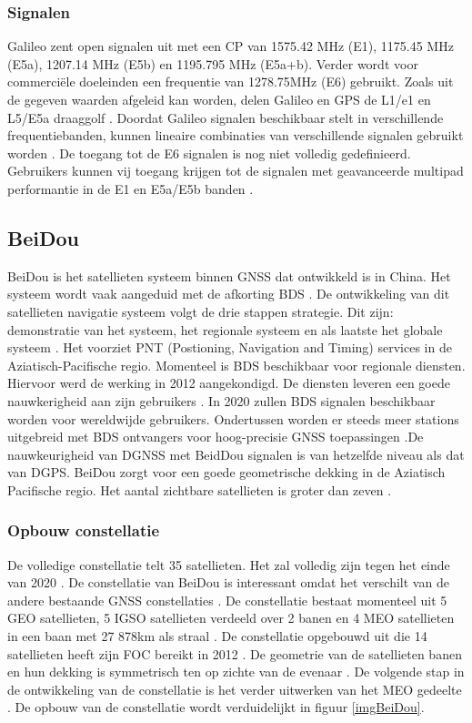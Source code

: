 \subsubsection{Signalen}
Galileo zent open signalen uit met een CP van 1575.42 MHz (E1), 1175.45 MHz (E5a), 1207.14 MHz (E5b) en 1195.795 MHz (E5a+b). Verder wordt voor commerci\"ele doeleinden een frequentie van 1278.75MHz (E6) gebruikt. Zoals uit de gegeven waarden afgeleid kan worden, delen Galileo en GPS de  L1/e1 en L5/E5a draaggolf \cite{LBibPPP2}. Doordat Galileo signalen beschikbaar stelt in verschillende frequentiebanden, kunnen lineaire combinaties van verschillende signalen gebruikt worden \cite{LBibGalileo3}. De toegang tot de E6 signalen is nog niet volledig gedefinieerd. Gebruikers kunnen vij toegang krijgen tot de signalen met geavanceerde multipad performantie in de E1 en E5a/E5b banden \cite{LBibGNSS9}. 

\subsection{BeiDou}
\label{LBeD}
BeiDou is het satellieten systeem binnen GNSS dat ontwikkeld is in China. Het systeem wordt vaak  aangeduid met de afkorting BDS \cite{LBibBeiDou}. De ontwikkeling van dit satellieten navigatie systeem volgt de drie stappen strategie. Dit zijn: demonstratie van het systeem, het regionale systeem en als laatste het globale systeem \cite{LBibBeiDou4}. Het voorziet PNT (Postioning, Navigation and Timing) services in de Aziatisch-Pacifische regio. Momenteel is BDS  beschikbaar voor regionale diensten. Hiervoor werd de werking in 2012 aangekondigd. De diensten leveren een goede nauwkerigheid aan zijn gebruikers \cite{LBibBeiDou, LBibGNSS9}. In 2020 zullen BDS signalen beschikbaar worden voor wereldwijde gebruikers. Ondertussen worden er steeds meer stations uitgebreid met BDS ontvangers voor hoog-precisie GNSS toepassingen \cite{LBibBeiDou}.De nauwkeurigheid van DGNSS met BeidDou signalen is van hetzelfde niveau als dat van DGPS. BeiDou zorgt voor een goede geometrische dekking in de Aziatisch Pacifische regio. Het aantal zichtbare satellieten is groter dan zeven \cite{LBibBeiDou4}. 

\subsubsection{Opbouw constellatie}
De volledige constellatie telt 35 satellieten. Het zal volledig zijn tegen het einde van 2020 \cite{LBibGNSS4}. De constellatie van BeiDou is interessant omdat het verschilt van de andere bestaande GNSS constellaties \cite{LBibBeiDou3}.  De constellatie bestaat momenteel uit 5 GEO satellieten, 5 IGSO satellieten verdeeld over 2 banen en 4 MEO satellieten in een baan met 27 878km als straal \cite{LBibBeiDou2}. De constellatie opgebouwd uit die 14 satellieten heeft zijn FOC bereikt in 2012 \cite{LBibBeiDou4}. De geometrie van de satellieten banen en hun dekking is symmetrisch ten op zichte van de evenaar \cite{LBibBeiDou5}.  De volgende stap in de ontwikkeling van de constellatie is het verder uitwerken van het MEO gedeelte \cite{LBibPPP2}. De opbouw van de constellatie wordt verduidelijkt in figuur \ref{imgBeiDou}.

